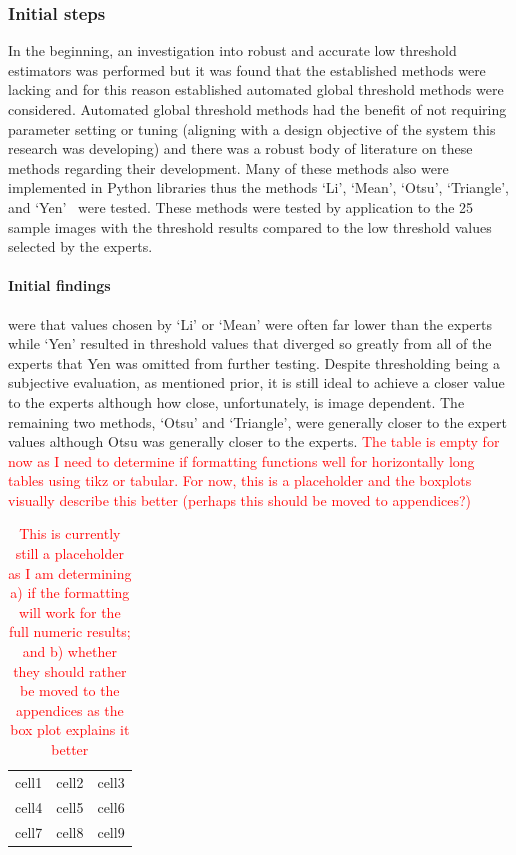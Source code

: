 \subsubsection*{Initial steps}
In the beginning, an investigation into robust and accurate low threshold estimators was performed but it was found that the established methods were lacking and for this reason established automated global threshold methods were considered. Automated global threshold methods had the benefit of not requiring parameter setting or tuning (aligning with a design objective of the system this research was developing) and there was a robust body of literature on these methods regarding their development. Many of these methods also were implemented in Python libraries thus the methods `Li', `Mean', `Otsu', `Triangle', and `Yen'~\cite{scikit-image} were tested. These methods were tested by application to the 25 sample images with the threshold results compared to the low threshold values selected by the experts.\paragraph{Initial findings} were that values chosen by `Li' or `Mean' were often far lower than the experts while `Yen' resulted in threshold values that diverged so greatly from all of the experts that Yen was omitted from further testing. Despite thresholding being a subjective evaluation, as mentioned prior, it is still ideal to achieve a closer value to the experts although how close, unfortunately, is image dependent. The remaining two methods, `Otsu' and `Triangle', were generally closer to the expert values although Otsu was generally closer to the experts.
\textcolor{red}{The table is empty for now as I need to determine if formatting functions well for horizontally long tables using tikz or tabular. For now, this is a placeholder and the boxplots visually describe this better (perhaps this should be moved to appendices?)}
\iffalse
\begin{table}
\begin{center}
\begin{tabular}{ |c|c|c| } 
 \hline
 cell1 & cell2 & cell3 \\ 
 cell4 & cell5 & cell6 \\ 
 cell7 & cell8 & cell9 \\ 
 \hline
\end{tabular}
\end{center}
\caption{\textcolor{red}{This is currently still a placeholder as I am determining a) if the formatting will work for the full numeric results; and b) whether they should rather be moved to the appendices as the box plot explains it better}\label{tab:results}}
\end{table}
